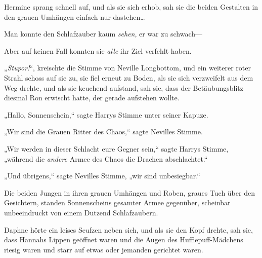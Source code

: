 Hermine sprang schnell auf, und als sie sich erhob, sah sie die beiden Gestalten in den grauen Umhängen einfach nur dastehen…

Man konnte den Schlafzauber kaum \emph{sehen}, er war zu schwach—

Aber auf keinen Fall konnten sie \emph{alle} ihr Ziel verfehlt haben.

„\emph{Stupor!}“, kreischte die Stimme von Neville Longbottom, und ein weiterer roter Strahl schoss auf sie zu, sie fiel erneut zu Boden, als sie sich verzweifelt aus dem Weg drehte, und als sie keuchend aufstand, sah sie, dass der Betäubungsblitz diesmal Ron erwischt hatte, der gerade aufstehen wollte.

„Hallo, Sonnenschein,“ sagte Harrys Stimme unter seiner Kapuze.

„Wir sind die Grauen Ritter des Chaos,“ sagte Nevilles Stimme.

„Wir werden in dieser Schlacht eure Gegner sein,“ sagte Harrys Stimme, „während die \emph{andere} Armee des Chaos die Drachen abschlachtet.“

„Und übrigens,“ sagte Nevilles Stimme, „wir sind unbesiegbar.“

\later

Die beiden Jungen in ihren grauen Umhängen und Roben, graues Tuch über den Gesichtern, standen Sonnenscheins gesamter Armee gegenüber, scheinbar unbeeindruckt von einem Dutzend Schlafzaubern.

Daphne hörte ein leises Seufzen neben sich, und als sie den Kopf drehte, sah sie, dass Hannahs Lippen geöffnet waren und die Augen des Hufflepuff-Mädchens riesig waren und starr auf etwas oder jemanden gerichtet waren.

